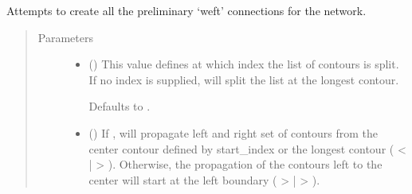 \documentclass[letterpaper,10pt,english]{sphinxmanual}
\begin{document}
\begin{fulllineitems}
\begin{fulllineitems}
\end{fulllineitems}


\begin{fulllineitems}
\label{\detokenize{cockatoo:cockatoo.KnitNetwork.initialize_weft_edges}}
Attempts to create all the preliminary ‘weft’ connections for the
network.
\begin{quote}\begin{description}
\item[{Parameters}] \leavevmode\begin{itemize}
\item {} 
 (\sphinxstyleliteralemphasis{\sphinxupquote{, }}) \textendash{} 
This value defines at which index the list of contours is split.
If no index is supplied, will split the list at the longest
contour.

Defaults to .


\item {} 
 (\sphinxstyleliteralemphasis{\sphinxupquote{, }}) \textendash{} 
If , will propagate left and right set of contours from
the center contour defined by start\_index or the longest contour
( \textless{} | \textgreater{} ). Otherwise, the propagation of the contours left to the
center will start at the left boundary ( \textgreater{} | \textgreater{} ).


\end{itemize}
\end{description}
\end{quote}
\end{fulllineitems}
\end{fulllineitems}
\end{document}
